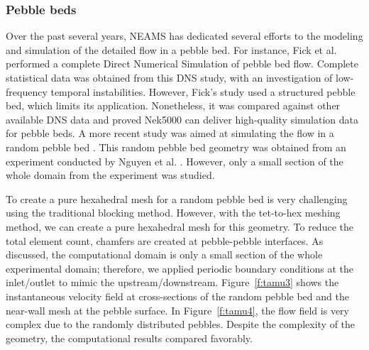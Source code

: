 \subsubsection{Pebble beds}

Over the past several years, NEAMS has dedicated several efforts to the modeling and simulation of the detailed flow in a pebble bed. For instance, Fick et al. \cite{fick2017direct}  performed a complete Direct Numerical Simulation of pebble bed flow. Complete statistical data was obtained from this DNS study, with an investigation of low-frequency temporal instabilities. However, Fick's study \cite{fick2017direct} used a structured pebble bed, which limits its application. Nonetheless, it was compared against other available DNS data and proved Nek5000 can deliver high-quality simulation data for pebble beds. A more recent study was aimed at simulating the flow in a random pebble bed \cite{yildiz2020direct}. This random pebble bed geometry was obtained from an experiment conducted by Nguyen et al. \cite{nguyen2018time}. However, only a small section of the whole domain from the experiment was studied.

To create a pure hexahedral mesh for a random pebble bed is very challenging using the traditional blocking method. However, with the tet-to-hex meshing method, we can create a pure hexahedral mesh for this geometry. To reduce the total element count, chamfers are created at pebble-pebble interfaces. As discussed, the computational domain is only a small section of the whole experimental domain; therefore, we applied periodic boundary conditions at the inlet/outlet to mimic the upstream/downstream. Figure~\ref{f:tamu3} shows the instantaneous velocity field at cross-sections of the random pebble bed and the near-wall mesh at the pebble surface. In Figure~\ref{f:tamu4}, the flow field is very complex due to the randomly distributed pebbles. Despite the complexity of the geometry, the computational results compared favorably.

